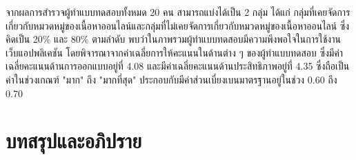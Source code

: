 \documentclass[12pt,oneside,openright,a4paper]{cpe-thai-project}
\begin{document}
      \hspace{1cm}จากผลการสำรวจผู้ทำแบบทดสอบทั้งหมด 20 คน สามารถแบ่งได้เป็น 2 กลุ่ม ได้แก่ 
      กลุ่มที่เคยจัดการเกี่ยวกับหมวดหมู่ของเนื้อหาออนไลน์และกลุ่มที่ไม่เคยจัดการเกี่ยวกับหมวดหมู่ของเนื้อหาออนไลน์
      ซึ่งคิดเป็น 20\% และ 80\% ตามลำดับ พบว่าในภาพรวมผู้ทำแบบทดสอบมีความพึงพอใจในการใช้งานเว็บแอปพลิเคชัน
      โดยพิจารณาจากค่าเฉลี่ยการให้คะแนนในด้านต่าง ๆ ของผู้ทำแบบทดสอบ ซึ่งมีค่าเฉลี่ยคะแนนด้านการออกแบบอยู่ที่ 4.08
      และมีค่าเฉลี่ยคะแนนด้านประสิทธิภาพอยู่ที่ 4.35 ซึ่งถือเป็นค่าในช่วงเกณฑ์ "มาก" ถึง "มากที่สุด" 
      ประกอบกับมีค่าส่วนเบี่ยงเบนมาตรฐานอยู่ในช่วง 0.60 ถึง 0.70


\chapter{บทสรุปและอภิปราย}

\end{document}
